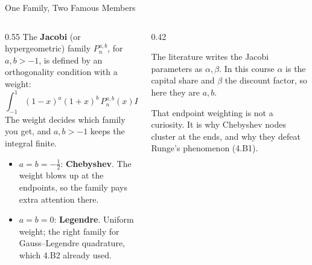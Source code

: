 \begin{frame}{One Family, Two Famous Members}
\begin{columns}[T]
\begin{column}{0.55\textwidth}
\small
The \textbf{Jacobi} (or hypergeometric) family $P_n^{a,b}$, for $a,b>-1$, is defined by an orthogonality condition with a weight:
\[
  \int_{-1}^{1}(1-x)^{a}(1+x)^{b}\,P_n^{a,b}(x)P_m^{a,b}(x)\,dx=0,\quad m\neq n .
\]
The weight decides which family you get, and $a,b>-1$ keeps the integral finite.
\medskip
\begin{itemize}\small
  \item $a=b=-\tfrac12$: \textbf{Chebyshev}. The weight blows up at the endpoints, so the family pays extra attention there.
  \item $a=b=0$: \textbf{Legendre}. Uniform weight; the right family for Gauss--Legendre quadrature, which 4.B2 already used.
\end{itemize}
\end{column}
\begin{column}{0.42\textwidth}
\begin{conceptbox}[title=\textbf{Notation}]\small
The literature writes the Jacobi parameters as $\alpha,\beta$. In this course $\alpha$ is the capital share and $\beta$ the discount factor, so here they are $a,b$.
\end{conceptbox}
\medskip
\begin{examplebox}\footnotesize
That endpoint weighting is not a curiosity. It is why Chebyshev nodes cluster at the ends, and why they defeat Runge's phenomenon (4.B1).
\end{examplebox}
\end{column}
\end{columns}
\vspace{1mm}
\end{frame}

